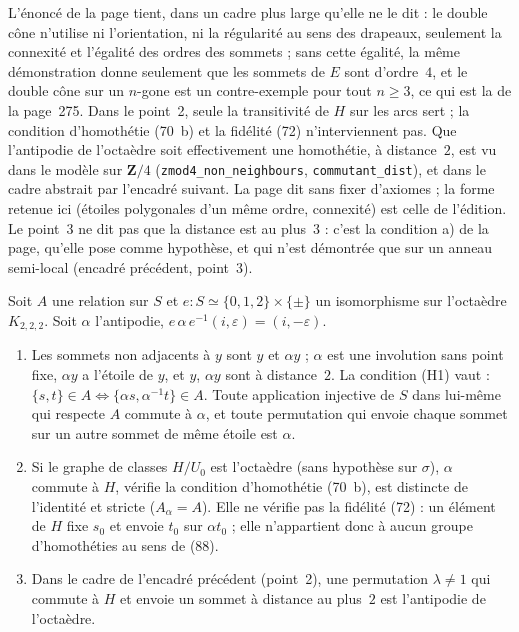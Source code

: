 \begin{remarque}
L'énoncé de la page tient, dans un cadre plus large qu'elle ne le dit : le double cône n'utilise ni l'orientation, ni la régularité au sens des drapeaux, seulement la connexité et l'égalité des ordres des sommets ; sans cette égalité, la même démonstration donne seulement que les sommets de $E$ sont d'ordre~$4$, et le double cône sur un $n$-gone est un contre-exemple pour tout $n \geq 3$, ce qui est la  de la page~275. Dans le point~2, seule la transitivité de $H$ sur les arcs sert ; la condition d'homothétie (70~b) et la fidélité (72) n'interviennent pas. Que l'antipodie de l'octaèdre soit effectivement une homothétie, à distance~$2$, est vu dans le modèle sur $\mathbf Z/4$ (\texttt{zmod4\_non\_neighbours}, \texttt{commutant\_dist}), et dans le cadre abstrait par l'encadré suivant. La page dit  sans fixer d'axiomes ; la forme retenue ici (étoiles polygonales d'un même ordre, connexité) est celle de l'édition. Le point~3 ne dit pas que la distance est au plus~$3$ : c'est la condition a) de la page, qu'elle pose comme hypothèse, et qui n'est démontrée que sur un anneau semi-local (encadré précédent, point~3).
\end{remarque}

\begin{encadre}
\begin{theoreme}
Soit $A$ une relation sur $S$ et $e : S \simeq \{0, 1, 2\} \times \{\pm\}$ un isomorphisme sur l'octaèdre $K_{2,2,2}$. Soit $\alpha$ l'antipodie, $e\,\alpha\,e^{-1}(i, \varepsilon) = (i, -\varepsilon)$.
\begin{enumerate}
\item Les sommets non adjacents à $y$ sont $y$ et $\alpha y$ ; $\alpha$ est une involution sans point fixe, $\alpha y$ a l'étoile de $y$, et $y$, $\alpha y$ sont à distance~$2$. La condition (H1) vaut : $\{s, t\} \in A \iff \{\alpha s, \alpha^{-1} t\} \in A$. Toute application injective de $S$ dans lui-même qui respecte $A$ commute à $\alpha$, et toute permutation qui envoie chaque sommet sur un autre sommet de même étoile est $\alpha$.
\item Si le graphe de classes $H/U_0$ est l'octaèdre (sans hypothèse sur $\sigma$), $\alpha$ commute à $H$, vérifie la condition d'homothétie (70~b), est distincte de l'identité et stricte ($A_\alpha = A$). Elle ne vérifie pas la fidélité (72) : un élément de $H$ fixe $s_0$ et envoie $t_0$ sur $\alpha t_0$ ; elle n'appartient donc à aucun groupe d'homothéties au sens de (88).
\item Dans le cadre de l'encadré précédent (point~2), une permutation $\lambda \neq 1$ qui commute à $H$ et envoie un sommet à distance au plus~$2$ est l'antipodie de l'octaèdre.
\end{enumerate}
\end{theoreme}
\end{encadre}


